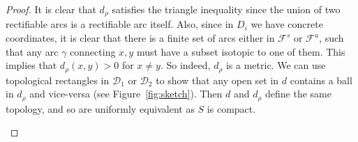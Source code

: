 \documentclass[10pt,a4paper]{amsart}
\newcommand{\mc}{\mathcal}
\begin{document}
\begin{proof}
It is clear that $d_\rho$ satisfies the triangle inequality since the union of two rectifiable arcs is a rectifiable arc itself. Also, since in $D_i$ we have concrete coordinates, it is clear that there is a finite set of arcs either in $\mc{F}^s$ or $\mc{F}^u$, such that any arc $\gamma$ connecting $x,y$ must have a subset isotopic to one of them. This implies that $d_\rho(x,y)>0$ for $x\neq y$. So indeed, $d_\rho$ is a metric. We can use topological rectangles in $\mc{D}_1$ or $\mc{D}_2$ to show that any open set in $d$ contains a ball in $d_\rho$ and vice-versa (see Figure~\ref{fig:sketch}). Then $d$ and $d_\rho$ define the same topology, and so are uniformly equivalent as $S$ is compact.

\begin{figure}[ht]
\centering
{}
\end{figure}
\end{proof}
\end{document}
